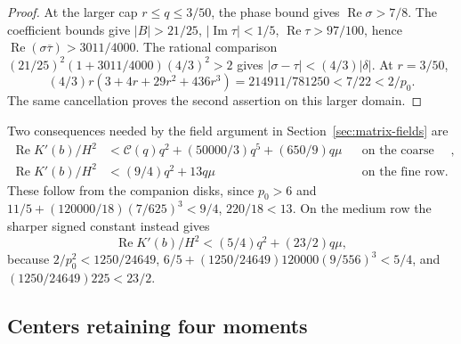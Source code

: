 \documentclass[11pt,reqno]{amsart}
\numberwithin{equation}{section}
\theoremstyle{definition}
\theoremstyle{remark}
\renewcommand{\Re}{\operatorname{Re}}
\renewcommand{\Im}{\operatorname{Im}}
\begin{document}
\begin{proof}
At the larger cap $r\le q\le3/50$, the phase bound gives
$\Re\sigma>7/8$. The coefficient bounds give
$|B|>21/25$, $|\Im\tau|<1/5$, $\Re\tau>97/100$, hence
$\Re(\sigma\overline\tau)>3011/4000$.
The rational comparison
$(21/25)^2(1+3011/4000)(4/3)^2>2$ gives
$|\sigma-\tau|<(4/3)|\delta|$. At $r=3/50$,
\[
 (4/3)r(3+4r+29r^2+436r^3)=214911/781250<7/22<2/p_0.
\]
The same cancellation proves the second assertion on this larger domain.
\end{proof}

Two consequences needed by the field argument in Section~\ref{sec:matrix-fields}
are
\begin{align}
 \Re K'(b)/H^2&<\mathcal C(q)q^2+(50000/3)q^5+(650/9)q\mu
 &&\text{on the coarse row},\label{lt:coarse-curvature}\\
 \Re K'(b)/H^2&<(9/4)q^2+13q\mu
 &&\text{on the fine row}.\label{lt:fine-curvature}
\end{align}
These follow from the companion disks, since $p_0>6$ and
$11/5+(120000/18)(7/625)^3<9/4$, $220/18<13$.
On the medium row the sharper signed constant instead gives
\begin{equation}\label{lt:medium-curvature}
 \Re K'(b)/H^2<(5/4)q^2+(23/2)q\mu,
\end{equation}
because $2/p_0^2<1250/24649$,
$6/5+(1250/24649)120000(9/556)^3<5/4$, and
$(1250/24649)225<23/2$.

\subsection{Centers retaining four moments}
\end{document}
